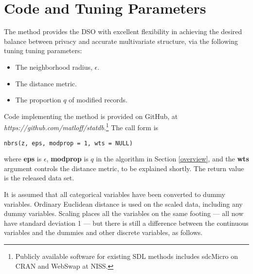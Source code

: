 \documentclass[11pt]{article}
\begin{document}



\section{Code and Tuning Parameters}

The method provides the DSO with excellent flexibility in achieving the
desired balance between privacy and accurate multivariate structure, via
the following tuning tuning parameters:

\begin{itemize}

\item The neighborhood radius, $\epsilon$.

\item The distance metric.

\item The proportion $q$ of modified records.  

\end{itemize}

Code implementing the method is provided on GitHub, at {\it
https://github.com/matloff/statdb}.\footnote{Publicly available software 
for existing SDL methods includes sdcMicro on CRAN and WebSwap at NISS. }  
The call form is

\begin{lstlisting}
nbrs(z, eps, modprop = 1, wts = NULL) 
\end{lstlisting}

where {\bf eps} is $\epsilon$, {\bf modprop} is $q$ in the algorithm
in Section \ref{overview}, and the {\bf wts} argument controls the
distance metric, to be explained shortly.  The return value is the
released data set.

It is assumed that all categorical variables have been converted to
dummy variables.  Ordinary Euclidean distance is used on the scaled
data, including any dummy variables.  Scaling places all the variables
on the same footing --- all now have standard deviation 1 --- but there
is still a difference between the continuous variables and the dummies
and other discrete variables, as follows.
\end{document}
